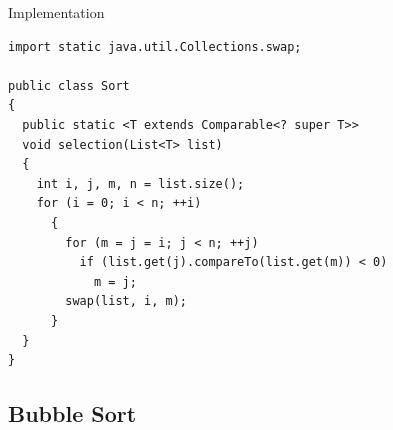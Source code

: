 \documentclass[pdf]{beamer}
\begin{document}
\begin{frame}[fragile,label=selimpl]{Implementation}
\begin{verbatim}
import static java.util.Collections.swap;

public class Sort
{
  public static <T extends Comparable<? super T>>
  void selection(List<T> list)
  {
    int i, j, m, n = list.size();
    for (i = 0; i < n; ++i)
      {
        for (m = j = i; j < n; ++j)
          if (list.get(j).compareTo(list.get(m)) < 0)
            m = j;
        swap(list, i, m);
      }
  }
}
\end{verbatim}
\end{frame}

\subsection{Bubble Sort}
\end{document}
